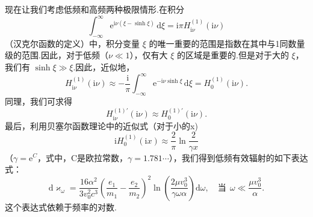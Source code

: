 现在让我们考虑低频和高频两种极限情形.在积分
\begin{equation}
  \int_{-\infty}^{\infty}\mathrm{e}^{\mathrm{i}\nu(\xi-\sinh\xi)}\,\mathrm{d}\xi=\mathrm{i}\pi H_{\mathrm{i}\nu}^{(1)}(\mathrm{i}\nu)
\end{equation}
（汉克尔函数的定义）中，积分变量 $\xi$ 的唯一重要的范围是指数在其中与1同数量级的范围.因此，对于低频（$\nu\ll 1$），仅有大 $\xi$ 的区域是重要的.但是对于大的 $\xi$，我们有 $\sinh\xi\gg\xi$.因此，近似地，
\begin{equation*}
  H_{\mathrm{i}\nu}^{(1)}(\mathrm{i}\nu)\approx-\frac{\mathrm{i}}{\pi}\int_{-\infty}^{\infty}\mathrm{e}^{-\mathrm{i}\nu\sinh\xi}\,\mathrm{d}\xi=H_0^{(1)}(\mathrm{i}\nu).
\end{equation*}
同理，我们可求得
\begin{equation*}
  H_{\mathrm{i}\nu}^{(1)\prime}(\mathrm{i}\nu)\approx H_0^{(1)\prime}(\mathrm{i}\nu).
\end{equation*}
最后，利用贝塞尔函数理论中的近似式（对于小的x)
\begin{equation*}
  \mathrm{i}H_0^{(1)}(\mathrm{i}x)\approx\frac{2}{\pi}\ln\frac{2}{\gamma x}
\end{equation*}
（$\gamma=\mathrm{e}^C$，式中，C是欧拉常数，$\gamma=1.781\cdots$），我们得到低频有效辐射的如下表达式：
\begin{equation}
  \mathrm{d}\varkappa_\omega=\frac{16\alpha^2}{3v_0^2c^3}\left(\frac{e_1}{m_1}-\frac{e_2}{m_2}\right)^2
  \ln\left(\frac{2\mu v_0^3}{\gamma\omega\alpha}\right)\mathrm{d}\omega,\quad
  \text{当}\ \ \omega\ll\frac{\mu v_0^3}{\alpha}.
\end{equation}
这个表达式依赖于频率的对数.

